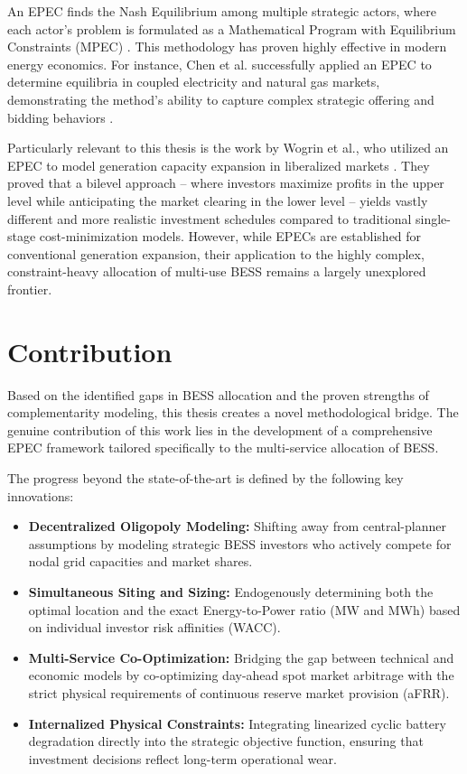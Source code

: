 An EPEC finds the Nash Equilibrium among multiple strategic actors, where each actor's problem is formulated as a Mathematical Program with Equilibrium Constraints (MPEC) \cite{conejo_complementarity_2020}. This methodology has proven highly effective in modern energy economics. For instance, Chen et al. successfully applied an EPEC to determine equilibria in coupled electricity and natural gas markets, demonstrating the method's ability to capture complex strategic offering and bidding behaviors \cite{chen_equilibria_2020}. 

Particularly relevant to this thesis is the work by Wogrin et al., who utilized an EPEC to model generation capacity expansion in liberalized markets \cite{wogrin_capacity_2013}. They proved that a bilevel approach -- where investors maximize profits in the upper level while anticipating the market clearing in the lower level -- yields vastly different and more realistic investment schedules compared to traditional single-stage cost-minimization models. However, while EPECs are established for conventional generation expansion, their application to the highly complex, constraint-heavy allocation of multi-use BESS remains a largely unexplored frontier.

\section{Contribution} \label{sec:novelty}
Based on the identified gaps in BESS allocation and the proven strengths of complementarity modeling, this thesis creates a novel methodological bridge. The genuine contribution of this work lies in the development of a comprehensive EPEC framework tailored specifically to the multi-service allocation of BESS. 

The progress beyond the state-of-the-art is defined by the following key innovations:
\begin{itemize}
    \item \textbf{Decentralized Oligopoly Modeling:} Shifting away from central-planner assumptions by modeling strategic BESS investors who actively compete for nodal grid capacities and market shares.
    \item \textbf{Simultaneous Siting and Sizing:} Endogenously determining both the optimal location and the exact Energy-to-Power ratio (MW and MWh) based on individual investor risk affinities (WACC).
    \item \textbf{Multi-Service Co-Optimization:} Bridging the gap between technical and economic models by co-optimizing day-ahead spot market arbitrage with the strict physical requirements of continuous reserve market provision (aFRR).
    \item \textbf{Internalized Physical Constraints:} Integrating linearized cyclic battery degradation directly into the strategic objective function, ensuring that investment decisions reflect long-term operational wear.
\end{itemize}


